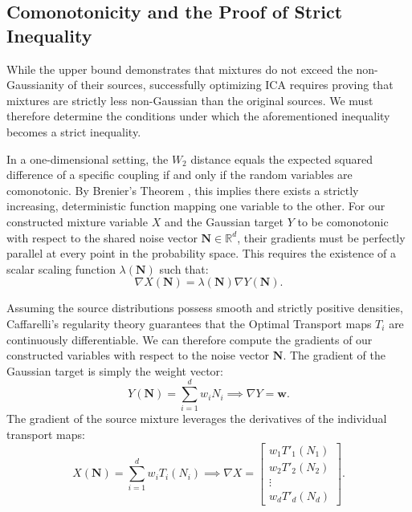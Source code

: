 \documentclass[12pt,a4paper,twoside,openany]{book}
\begin{document}
\subsection{Comonotonicity and the Proof of Strict Inequality}
While the upper bound demonstrates that mixtures do not exceed the non-Gaussianity of their sources, successfully optimizing ICA requires proving 
that mixtures are strictly less non-Gaussian than the original sources. We must therefore determine the conditions under which the aforementioned 
inequality becomes a strict inequality. 

In a one-dimensional setting, the $W_2$ distance equals the expected squared difference of a specific coupling if and only if the random variables 
are comonotonic. By Brenier's Theorem \cite{brenier1991}, this implies there exists a strictly increasing, deterministic function mapping one variable to the other. 
For our constructed mixture variable $X$ and the Gaussian target $Y$ to be comonotonic with respect to the shared noise vector $\mathbf{N} \in \mathbb{R}^d$, 
their gradients must be perfectly parallel at every point in the probability space. This requires the existence of a scalar scaling function $\lambda(\mathbf{N})$ such that:
\begin{equation}
    \nabla X(\mathbf{N}) = \lambda(\mathbf{N}) \nabla Y(\mathbf{N}).
\end{equation}

Assuming the source distributions possess smooth and strictly positive densities, Caffarelli's regularity theory \cite{caffarelli1992} guarantees that the 
Optimal Transport maps $T_i$ are continuously differentiable. We can therefore compute the gradients of our constructed variables with respect to the noise vector $\mathbf{N}$. 
The gradient of the Gaussian target is simply the weight vector:
\begin{equation}
    Y(\mathbf{N}) = \sum_{i=1}^d w_i N_i \implies \nabla Y = \mathbf{w}.
\end{equation}
The gradient of the source mixture leverages the derivatives of the individual transport maps:
\begin{equation}
    X(\mathbf{N}) = \sum_{i=1}^d w_i T_i(N_i) \implies \nabla X = \begin{bmatrix} w_1 T'_1(N_1) \\ w_2 T'_2(N_2) \\ \vdots \\ w_d T'_d(N_d) \end{bmatrix}.
\end{equation}
\end{document}
